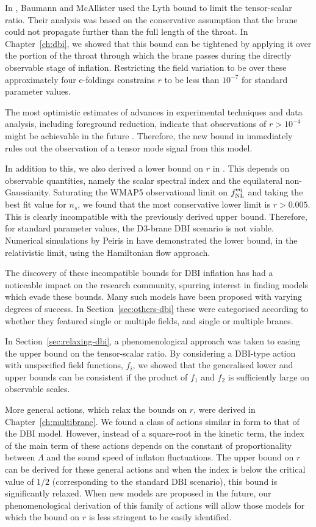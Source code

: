 In , Baumann and McAllister used the Lyth bound \cite{lyth} to limit
the tensor-scalar ratio. Their analysis was based on the conservative assumption that the brane
could
not propagate further than the full length of the throat. In Chapter~\ref{ch:dbi},
we showed that this bound can be tightened by applying it over the
portion of the throat through which the brane passes during the directly observable
stage of inflation. Restricting the field variation to be over these
approximately four e-foldings constrains $r$ to be less than $10^{-7}$ for standard
parameter values.

The most optimistic estimates of advances in experimental techniques and data
analysis, including foreground reduction, indicate that observations of $r>10^{-4}$
might be achievable in the future \cite{Baumann:2008aq,vpj}. Therefore, the new bound in
 immediately rules out the observation of a tensor mode signal
from this model.

In addition to this, we also derived a lower bound on $r$ in .
This depends on observable quantities, namely the scalar spectral index and the
equilateral non-Gaussianity. Saturating the WMAP5 observational limit on $f_{\mathrm{NL}}^{\mathrm{eq}}$
and taking the best fit value for $n_s$, we found that the most conservative lower
limit is $r>0.005$. This is clearly incompatible with the previously derived upper
bound. Therefore, for standard parameter values, the D3-brane DBI scenario is not
viable. Numerical simulations by Peiris \etal in  have
demonstrated the lower bound, in the relativistic limit, using the
Hamiltonian flow approach.

The discovery of these incompatible bounds for DBI inflation has had a noticeable
impact on the research community, spurring interest in finding models which evade
these bounds. Many such models have been proposed with varying degrees of success. In
Section~\ref{sec:others-dbi} these were categorised according to whether they
featured single or multiple fields, and single or multiple branes. 

In Section~\ref{sec:relaxing-dbi}, a phenomenological approach was taken to easing
the upper bound on the tensor-scalar ratio. By considering a DBI-type action with unspecified field
functions,
$f_i$, we showed that the generalised lower and upper bounds can be consistent
if the product of $f_1$ and $f_2$ is sufficiently large on observable scales.


More general actions, which relax the bounds on $r$, were derived in
Chapter~\ref{ch:multibrane}. 
We found a class of actions similar in form to that of the DBI model. 
However, instead of a square-root in the kinetic term, the index of the main term of these
actions depends on the constant of proportionality between $\Lambda$ and the sound
speed of inflaton fluctuations.
The upper bound on $r$ can be derived for these general actions and when the index
is below the critical value of $1/2$ (corresponding to the standard DBI scenario), this bound is
significantly relaxed.  
When new models are proposed in the future, our phenomenological derivation of this family of
actions will allow those models for which the bound on $r$ is less stringent to be easily
identified.

